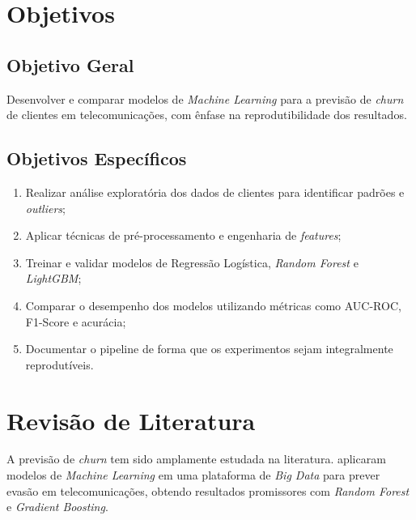 \documentclass[
    article,
    12pt,
    oneside,
    a4paper,
    english,
    brazilian
    ]{abntex2}
\numberwithin{equation}{section}
\begin{document}
\section{Objetivos}

\subsection{Objetivo Geral}

Desenvolver e comparar modelos de \textit{Machine Learning} para a previsão de \textit{churn} de clientes em telecomunicações, com ênfase na reprodutibilidade dos resultados.

\subsection{Objetivos Específicos}

\begin{enumerate}
    \item Realizar análise exploratória dos dados de clientes para identificar padrões e \textit{outliers};
    \item Aplicar técnicas de pré-processamento e engenharia de \textit{features};
    \item Treinar e validar modelos de Regressão Logística, \textit{Random Forest} e \textit{LightGBM};
    \item Comparar o desempenho dos modelos utilizando métricas como AUC-ROC, F1-Score e acurácia;
    \item Documentar o pipeline de forma que os experimentos sejam integralmente reprodutíveis.
\end{enumerate}

\section{Revisão de Literatura}

A previsão de \textit{churn} tem sido amplamente estudada na literatura.  aplicaram modelos de \textit{Machine Learning} em uma plataforma de \textit{Big Data} para prever evasão em telecomunicações, obtendo resultados promissores com \textit{Random Forest} e \textit{Gradient Boosting}.
\end{document}
